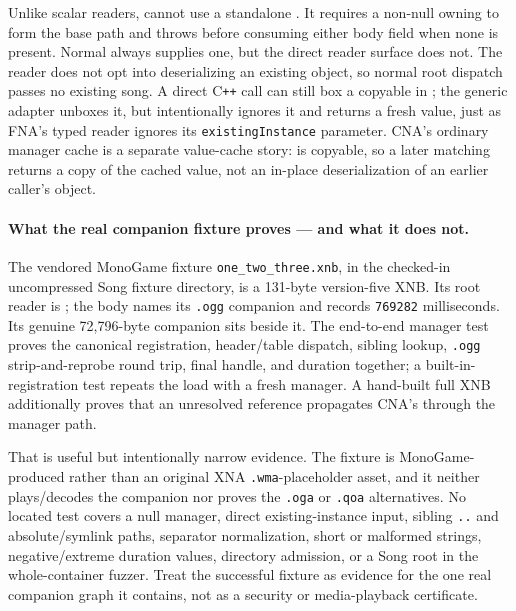 Unlike scalar readers,  cannot use a standalone .
It requires a non-null owning  to form the base path and throws
 before consuming either body field when none is present.  Normal
 always supplies one, but the direct reader surface does not.
The reader does not opt into deserializing an existing object, so normal root dispatch passes no
existing song.  A direct C\texttt{++}
 call can still box a copyable  in ; the
generic adapter unboxes it, but  intentionally ignores it and returns a
fresh value, just as FNA's typed reader ignores its \texttt{existingInstance} parameter.  CNA's
ordinary manager cache is a separate value-cache story:  is copyable, so a later
matching  returns a copy of the cached value, not an in-place deserialization
of an earlier caller's object.

\paragraph{What the real companion fixture proves --- and what it does not.}
The vendored MonoGame fixture \texttt{one\_two\_three.xnb}, in the checked-in uncompressed Song
fixture directory, is a 131-byte version-five XNB.  Its root reader is ; the
body names its \texttt{.ogg} companion and records \texttt{769282} milliseconds.  Its genuine
72,796-byte companion sits beside it.  The end-to-end manager test proves the
canonical registration, header/table dispatch, sibling lookup, \texttt{.ogg} strip-and-reprobe
round trip, final handle, and duration together; a built-in-registration test repeats the load
with a fresh manager.  A hand-built full XNB additionally proves that an unresolved reference
propagates CNA's  through the manager path.

That is useful but intentionally narrow evidence.  The fixture is MonoGame-produced rather than
an original XNA \texttt{.wma}-placeholder asset, and it neither plays/decodes the companion nor
proves the \texttt{.oga} or \texttt{.qoa} alternatives.  No located test covers a null manager,
direct existing-instance input, sibling \texttt{..} and absolute/symlink paths, separator
normalization, short or malformed strings, negative/extreme duration values, directory admission,
or a Song root in the whole-container fuzzer.  Treat the successful fixture as evidence for the
one real companion graph it contains, not as a security or media-playback certificate.

